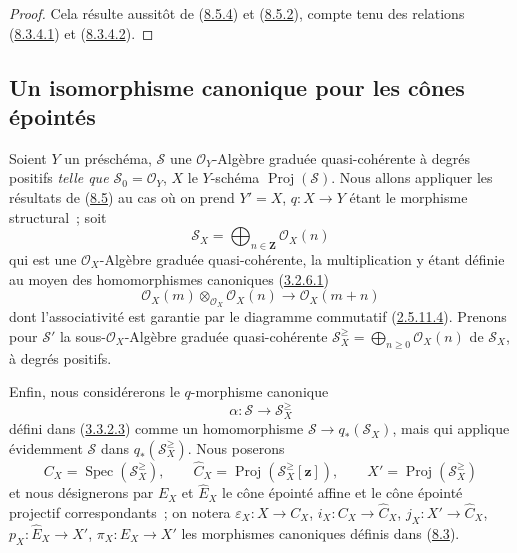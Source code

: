 \begin{proof}
Cela résulte aussitôt de (\hyperref[II.8.5.4-fr]{8.5.4}) et
(\hyperref[II.8.5.2-fr]{8.5.2}), compte tenu des relations
(\hyperref[II.8.3.4.1-fr]{8.3.4.1}) et
(\hyperref[II.8.3.4.2-fr]{8.3.4.2}).
\end{proof}

\subsection{Un isomorphisme canonique pour les cônes épointés}
\label{subsection:II.8.6-fr}

\begin{env}[8.6.1]
\label{II.8.6.1-fr}
Soient $Y$ un préschéma, $\mathcal{S}$ une $\mathcal{O}_Y$-Algèbre graduée
quasi-cohérente à degrés positifs \emph{telle que
$\mathcal{S}_0=\mathcal{O}_Y$}, $X$ le $Y$-schéma
$\operatorname{Proj}(\mathcal{S})$. Nous allons appliquer les résultats de
(\hyperref[subsection:II.8.5-fr]{8.5}) au cas où on prend $Y'=X$,
$q:X\to Y$ étant le morphisme structural~; soit
\begin{equation}
\label{II.8.6.1.1-fr}
  \mathcal{S}_X=\bigoplus_{n\in\mathbf{Z}}\mathcal{O}_X(n)
\tag{8.6.1.1}
\end{equation}
qui est une $\mathcal{O}_X$-Algèbre graduée quasi-cohérente, la multiplication
y étant définie au moyen des homomorphismes canoniques
(\hyperref[II.3.2.6.1-fr]{3.2.6.1})
\[
  \mathcal{O}_X(m)\otimes_{\mathcal{O}_X}\mathcal{O}_X(n)
  \to\mathcal{O}_X(m+n)
\]
dont l'associativité est garantie par le diagramme commutatif
(\hyperref[II.2.5.11.4-fr]{2.5.11.4}). Prenons pour $\mathcal{S}'$ la
sous-$\mathcal{O}_X$-Algèbre graduée quasi-cohérente
$\mathcal{S}_X^{\geq}=\bigoplus_{n\geq0}\mathcal{O}_X(n)$ de
$\mathcal{S}_X$, à degrés positifs.

Enfin, nous considérerons le $q$-morphisme canonique
\begin{equation}
\label{II.8.6.1.2-fr}
  \alpha:\mathcal{S}\to\mathcal{S}_X^{\geq}
\tag{8.6.1.2}
\end{equation}
défini dans (\hyperref[II.3.3.2.3-fr]{3.3.2.3}) comme un homomorphisme
$\mathcal{S}\to q_*(\mathcal{S}_X)$, mais qui applique évidemment
$\mathcal{S}$ dans $q_*(\mathcal{S}_X^{\geq})$. Nous poserons
\begin{equation}
\label{II.8.6.1.3-fr}
  C_X=\operatorname{Spec}(\mathcal{S}_X^{\geq}),\qquad
  \widehat{C}_X=\operatorname{Proj}(\mathcal{S}_X^{\geq}[\mathbf{z}]),\qquad
  X'=\operatorname{Proj}(\mathcal{S}_X^{\geq})
\tag{8.6.1.3}
\end{equation}
et nous désignerons par $E_X$ et $\widehat{E}_X$ le cône épointé affine et le
cône épointé projectif correspondants~; on notera
$\varepsilon_X:X\to C_X$, $i_X:C_X\to\widehat{C}_X$,
$j_X:X'\to\widehat{C}_X$, $p_X:\widehat{E}_X\to X'$,
$\pi_X:E_X\to X'$ les morphismes canoniques définis dans
(\hyperref[subsection:II.8.3-fr]{8.3}).
\end{env}

